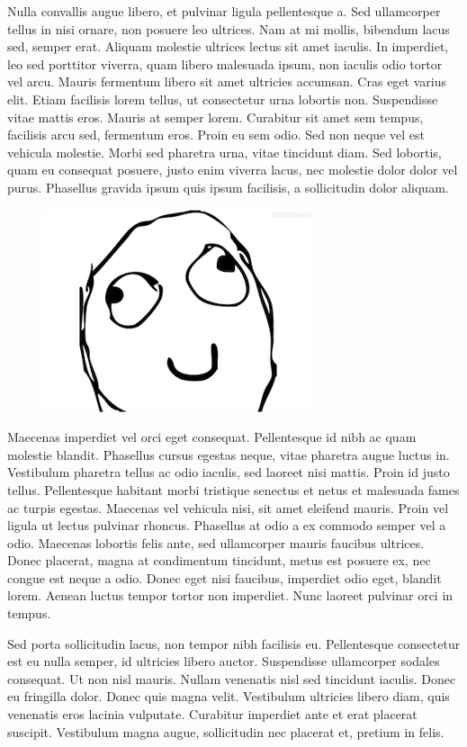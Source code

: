 \documentclass{article}
\begin{document}
 Nulla convallis augue libero, et pulvinar ligula pellentesque a. Sed ullamcorper tellus in nisi ornare, non posuere leo ultrices. Nam at mi mollis, bibendum lacus sed, semper erat. Aliquam molestie ultrices lectus sit amet iaculis. In imperdiet, leo sed porttitor viverra, quam libero malesuada ipsum, non iaculis odio tortor vel arcu. Mauris fermentum libero sit amet ultricies accumsan. Cras eget varius elit. Etiam facilisis lorem tellus, ut consectetur urna lobortis non. Suspendisse vitae mattis eros. Mauris at semper lorem. Curabitur sit amet sem tempus, facilisis arcu sed, fermentum eros. Proin eu sem odio. Sed non neque vel est vehicula molestie. Morbi sed pharetra urna, vitae tincidunt diam. Sed lobortis, quam eu consequat posuere, justo enim viverra lacus, nec molestie dolor dolor vel purus. Phasellus gravida ipsum quis ipsum facilisis, a sollicitudin dolor aliquam. 


\begin{figure}[h]
\centering
\includegraphics{meme.png}
\end{figure}


 Maecenas imperdiet vel orci eget consequat. Pellentesque id nibh ac quam molestie blandit. Phasellus cursus egestas neque, vitae pharetra augue luctus in. Vestibulum pharetra tellus ac odio iaculis, sed laoreet nisi mattis. Proin id justo tellus. Pellentesque habitant morbi tristique senectus et netus et malesuada fames ac turpis egestas. Maecenas vel vehicula nisi, sit amet eleifend mauris. Proin vel ligula ut lectus pulvinar rhoncus. Phasellus at odio a ex commodo semper vel a odio. Maecenas lobortis felis ante, sed ullamcorper mauris faucibus ultrices. Donec placerat, magna at condimentum tincidunt, metus est posuere ex, nec congue est neque a odio. Donec eget nisi faucibus, imperdiet odio eget, blandit lorem. Aenean luctus tempor tortor non imperdiet. Nunc laoreet pulvinar orci in tempus. 



 Sed porta sollicitudin lacus, non tempor nibh facilisis eu. Pellentesque consectetur est eu nulla semper, id ultricies libero auctor. Suspendisse ullamcorper sodales consequat. Ut non nisl mauris. Nullam venenatis nisl sed tincidunt iaculis. Donec eu fringilla dolor. Donec quis magna velit. Vestibulum ultricies libero diam, quis venenatis eros lacinia vulputate. Curabitur imperdiet ante et erat placerat suscipit. Vestibulum magna augue, sollicitudin nec placerat et, pretium in felis. 
\end{document}
